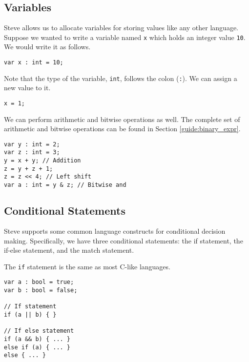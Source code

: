 \subsection{Variables} \label{tut:variable}

Steve allows us to allocate variables for storing values like any other
language. Suppose we wanted to write a variable named \texttt{x} which holds an
integer value \texttt{10}. We would write it as follows.

\begin{codepage}
\begin{lstlisting}
var x : int = 10;
\end{lstlisting}
\end{codepage}

Note that the type of the variable, \texttt{int}, follows the colon
(\texttt{:}). We can assign a new value to it.

\begin{codepage}
\begin{lstlisting}
x = 1;
\end{lstlisting}
\end{codepage}

We can perform arithmetic and bitwise operations as well. The complete set of
arithmetic and bitwise operations can be found in Section
\ref{guide:binary_expr}.

\begin{codepage}
\begin{lstlisting}
var y : int = 2;
var z : int = 3;
y = x + y; // Addition
z = y + z + 1;
z = z << 4; // Left shift
var a : int = y & z; // Bitwise and
\end{lstlisting}
\end{codepage}


\subsection{Conditional Statements} \label{tut:condition}

Steve supports some common language constructs for conditional decision making.
Specifically, we have three conditional statements: the if statement, the
if-else statement, and the match statement.

The \texttt{if} statement is the same as most C-like languages.

\begin{codepage}
\begin{lstlisting}
var a : bool = true;
var b : bool = false;

// If statement
if (a || b) { }

// If else statement
if (a && b) { ... }
else if (a) { ... }
else { ... }
\end{lstlisting}
\end{codepage}

